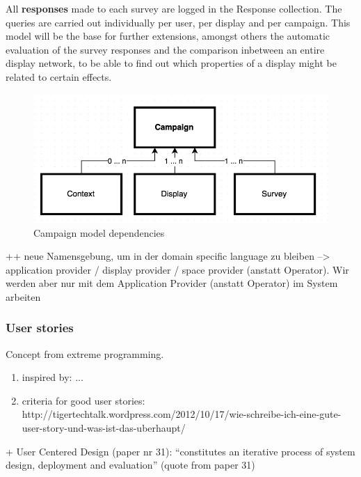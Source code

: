 All \textbf{responses} made to each survey are logged in the Response collection. The queries are carried out individually per user, per display and per campaign. This model will be the base for further extensions, amongst others the automatic evaluation of the survey responses and the comparison inbetween an entire display network, to be able to find out which properties of a display might be related to certain effects.


\begin{figure}%
    \begin{center}
        \includegraphics[width=.8\columnwidth]{img/4_implementation/4-dependency-campaign}
    \end{center}
 \caption{Campaign model dependencies}
 \label{fig:4-dependency-campaign}
\end{figure}


++ neue Namensgebung, um in der domain specific language zu bleiben --> application provider / display provider / space provider (anstatt Operator). Wir werden aber nur mit dem Application Provider (anstatt Operator) im System arbeiten




\subsubsection{User stories}

Concept from extreme programming.

\begin{enumerate}
\item inspired by: ...
\item criteria for good user stories: http://tigertechtalk.wordpress.com/2012/10/17/wie-schreibe-ich-eine-gute-user-story-und-was-ist-das-uberhaupt/
\end{enumerate}



+ User Centered Design (paper nr 31): ``constitutes an iterative process of system design, deployment and evaluation'' (quote from paper 31)






